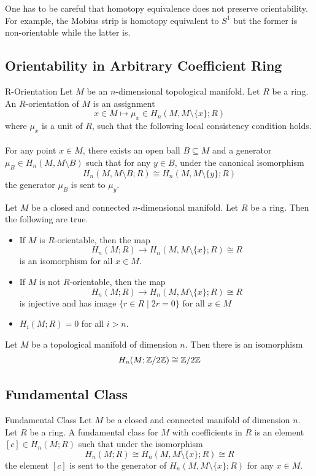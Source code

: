 \documentclass[a4paper]{article}
\begin{document}
One has to be careful that homotopy equivalence does not preserve orientability. For example, the Mobius strip is homotopy equivalent to $S^1$ but the former is non-orientable while the latter is. 

\subsection{Orientability in Arbitrary Coefficient Ring}
\begin{defn}{R-Orientation}{} Let $M$ be an $n$-dimensional topological manifold. Let $R$ be a ring. An $R$-orientation of $M$ is an assignment $$x\in M\mapsto\mu_x\in H_n(M,M\setminus\{x\};R)$$ where $\mu_x$ is a unit of $R$, such that the following local consistency condition holds. \\~\\

For any point $x\in M$, there exists an open ball $B\subseteq M$ and a generator $\mu_B\in H_n(M,M\setminus B)$ such that for any $y\in B$, under the canonical isomorphism $$H_n(M,M\setminus B;R)\cong H_n(M,M\setminus\{y\};R)$$ the generator $\mu_B$ is sent to $\mu_y$. 
\end{defn}

\begin{thm}{}{} Let $M$ be a closed and connected $n$-dimensional manifold. Let $R$ be a ring. Then the following are true. 
\begin{itemize}
\item If $M$ is $R$-orientable, then the map $$H_n(M;R)\to H_n(M,M\setminus\{x\};R)\cong R$$ is an isomorphism for all $x\in M$. 
\item If $M$ is not $R$-orientable, then the map $$H_n(M;R)\to H_n(M,M\setminus\{x\};R)\cong R$$ is injective and has image $\{r\in R\;|\;2r=0\}$ for all $x\in M$
\item $H_i(M;R)=0$ for all $i>n$. 
\end{itemize}
\end{thm}

\begin{crl}{}{} Let $M$ be a topological manifold of dimension $n$. Then there is an isomorphism $$H_n(M;\mathbb{Z}/2\mathbb{Z})\cong\mathbb{Z}/2\mathbb{Z}$$
\end{crl}

\subsection{Fundamental Class}
\begin{defn}{Fundamental Class}{} Let $M$ be a closed and connected manifold of dimension $n$. Let $R$ be a ring. A fundamental class for $M$ with coefficients in $R$ is an element $[c]\in H_n(M;R)$ such that under the isomorphism $$H_n(M;R)\cong H_n(M,M\setminus\{x\};R)\cong R$$ the element $[c]$ is sent to the generator of $H_n(M,M\setminus\{x\};R)$ for any $x\in M$. 
\end{defn}
\end{document}
